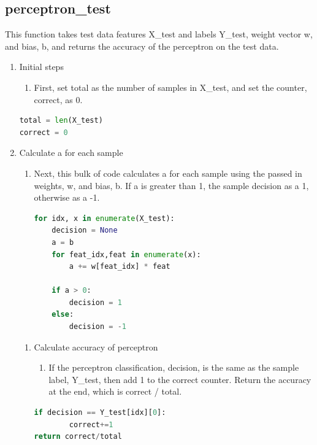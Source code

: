 \documentclass[11pt]{article}
\theoremstyle{definition}
\begin{document}
\clearpage
\subsection{perceptron\_test}
This function takes test data features \textsf{X\_test} and labels \textsf{Y\_test}, weight vector \textsf{w}, and bias, \textsf{b}, and returns the accuracy of the perceptron on the test data.
\begin{enumerate}
    \item Initial steps
    \begin{enumerate}
        \item First, set \textsf{total} as the number of samples in \textsf{X\_test}, and set the counter, \textsf{correct}, as 0.
    \end{enumerate}
\begin{lstlisting}[language=python, frame=single]
total = len(X_test)
correct = 0
\end{lstlisting}
    \item Calculate \textsf{a} for each sample
    \begin{enumerate}
        \item Next, this bulk of code calculates \textsf{a} for each sample using the passed in weights, \textsf{w}, and bias, \textsf{b}. If \textsf{a} is greater than 1, the sample \textsf{decision} as a 1, otherwise as a -1.
\begin{lstlisting}[language=python, frame=single]
for idx, x in enumerate(X_test):
    decision = None
    a = b
    for feat_idx,feat in enumerate(x):
        a += w[feat_idx] * feat

    if a > 0:
        decision = 1
    else:
        decision = -1
\end{lstlisting}
    \end{enumerate}
\begin{enumerate}
    \item Calculate accuracy of perceptron
    \begin{enumerate}
        \item If the perceptron classification, \textsf{decision}, is the same as the sample label, \textsf{Y\_test}, then add 1 to the \textsf{correct} counter. Return the accuracy at the end, which is \textsf{correct / total}.
    \end{enumerate}
\begin{lstlisting}[language=python, frame=single]
    if decision == Y_test[idx][0]:
        correct+=1
return correct/total
\end{lstlisting}
\end{enumerate}
\end{enumerate}
\end{document}
